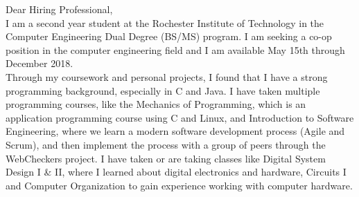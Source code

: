 \documentclass[line,margin]{res}
\begin{document}
\setlength\columnsep{-30pt}
\email{} %
\phone{} %
\address{} %
\address{} %
\website{} %

\begin{resume}
 \setlength
 \multicolsep{2pt}
 \begin{adjustwidth}{-92pt}{0pt}
 \vspace{10pt}

\noindent
Dear Hiring Professional, \\

\noindent
I am a second year student at the Rochester Institute of Technology in the Computer Engineering Dual Degree (BS/MS) program. I am seeking a co-op position in the computer engineering field and I am available May 15th through December 2018. \\

\noindent
Through my coursework and personal projects, I found that I have a strong programming background, especially in C and Java. I have taken multiple programming courses, like the Mechanics of Programming, which is an application programming course using C and Linux, and Introduction to Software Engineering, where we learn a modern software development process (Agile and Scrum), and then implement the process with a group of peers through the WebCheckers project. I have taken or are taking classes like Digital System Design I \& II, where I learned about digital electronics and hardware, Circuits I and Computer Organization to gain experience working with computer hardware. \\


\end{adjustwidth}
\end{resume}
\end{document}
